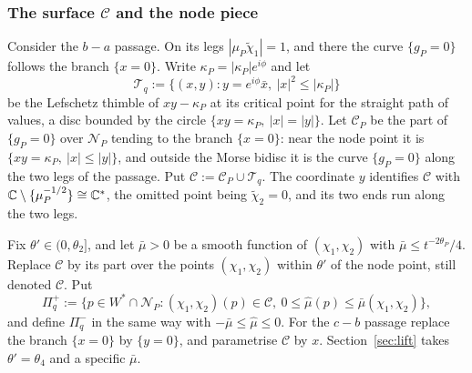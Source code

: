 \subsubsection*{The surface $\mathscr C$ and the node piece}
Consider the $b-a$ passage. On its legs $|\mu_P\tilde\chi_1|=1$, and there the curve $\{g_P=0\}$ follows the branch
$\{x=0\}$. Write $\kappa_P=|\kappa_P|e^{i\phi}$ and let
\[
\mathscr T_q:=\{(x,y):y=e^{i\phi}\bar x,\ |x|^2\le|\kappa_P|\}
\]
be the Lefschetz thimble of $xy-\kappa_P$ at its critical point for the straight path of values, a disc bounded by the
circle $\{xy=\kappa_P,\ |x|=|y|\}$. Let $\mathscr C_P$ be the part of $\{g_P=0\}$ over $\mathcal N_P$ tending to the branch
$\{x=0\}$: near the node point it is $\{xy=\kappa_P,\ |x|\le|y|\}$, and outside the Morse bidisc it is the curve
$\{g_P=0\}$ along the two legs of the passage. Put $\mathscr C:=\mathscr C_P\cup\mathscr T_q$. The coordinate $y$ identifies
$\mathscr C$ with $\mathbb C\setminus\{\mu_P^{-1/2}\}\cong\mathbb C^*$, the omitted point being $\tilde\chi_2=0$, and its two ends run
along the two legs.

\begin{definition}\label{def:nodepiece}
Fix $\theta'\in(0,\theta_2]$, and let $\bar\mu>0$ be a smooth function of $(\chi_1,\chi_2)$ with
$\bar\mu\le t^{-2\theta_P}/4$. Replace $\mathscr C$ by its part over the points $(\chi_1,\chi_2)$ within $\theta'$ of the node
point, still denoted $\mathscr C$. Put
\[
\Pi_q^{+}:=\{p\in W^*\cap\mathcal N_P:(\chi_1,\chi_2)(p)\in\mathscr C,\ 0\le\hat\mu(p)\le\bar\mu(\chi_1,\chi_2)\},
\]
and define $\Pi_q^-$ in the same way with $-\bar\mu\le\hat\mu\le0$. For the $c-b$ passage replace the branch $\{x=0\}$ by
$\{y=0\}$, and parametrise $\mathscr C$ by $x$. Section~\ref{sec:lift} takes $\theta'=\theta_4$ and a specific $\bar\mu$.
\end{definition}

